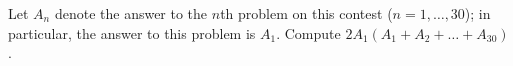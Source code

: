 Let $A_n$ denote the answer to the $n$th problem on this contest ($n=1,\dots,30$); in particular, the answer to this problem is $A_1$. Compute $2A_1(A_1+A_2+\dots+A_{30})$.
